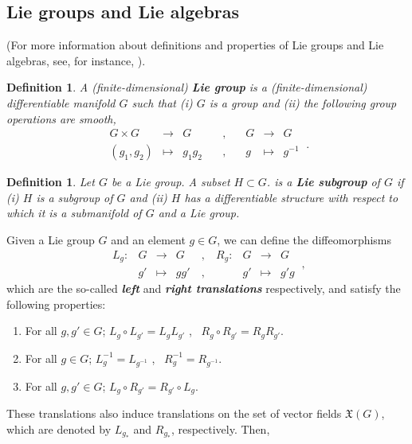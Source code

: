 \documentclass[12pt]{report}
\newtheorem{definition}[teor]{Definition}
\def\vf{\mathfrak X}
\begin{document}
\begin{appendix}


\section{Lie groups and Lie algebras}
\label{Liega}


(For more information about definitions and properties of Lie groups and Lie algebras, see,
for instance, \cite{Ar-89,CP-adg,Ok-87,To-65,Wa-fsmlg}).

\begin{definition}
A (finite-dimensional) \textbf{Lie group}
is a (finite-dimensional) differentiable manifold $G$ such that
{\rm (i)}
$G$ is a group and
{\rm (ii)}
the following group operations are smooth,
$$
\begin{array}{ccccccc}
G \times G &\to& G & \quad , \quad & G &\to& G
\\
(g_1,g_2) &\mapsto& g_1g_2 & \quad , \quad & g &\mapsto& g^{-1}
\end{array} \ .
$$
\end{definition}

\begin{definition}
Let $G$ be a Lie group. A subset $H \subset G$.
is a \textbf{Lie subgroup} of $G$ if
{\rm (i)} $H$ is a subgroup of $G$ and
{\rm (ii)} $H$ has a differentiable structure with respect
to which it is a submanifold of $G$ and a Lie group.
\end{definition}

Given a Lie group $G$ and an element $g \in G$,
we can define the diffeomorphisms
$$
\begin{array}{ccccccccc}
L_g \colon & G & \to & G & \ , \ & R_g \colon & G & \to & G
\\
& g' & \mapsto & gg' & \ , \ & &  g' & \mapsto & g'g
\end{array} \ ,
$$
which are the so-called {\sl \textbf{left}} and {\sl \textbf{right translations}}
respectively, and satisfy the following properties:
\begin{enumerate}
\item
For all $g,g' \in G$;\quad
$L_g \circ L_{g'} = L_gL_{g'}$ , \ 
$R_g \circ R_{g'} = R_gR_{g'}$.
\item
For all $g \in G$;\quad
$L_g^{-1} = L_{g^{-1}}$ , \
$R_g^{-1} = R_{g^{-1}}$.
\item
For all $g,g' \in G$;
$L_g \circ R_{g'} = R_{g'} \circ L_g$.
\end{enumerate}
These translations also induce translations on the set of
vector fields $\vf(G)$, which are denoted by
$L_{g_*}$ and $R_{g_*}$, respectively. Then, 


\end{appendix}
\end{document}
